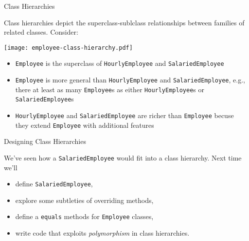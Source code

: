 \documentclass{beamer}
\begin{document}
\begin{frame}[fragile]{Class Hierarchies}

\vspace{-.05in}
Class hierarchies depict the superclass-sublclass relationships between families of related classes.  Consider:
\vspace{-.05in}
\begin{center}
\texttt{[image: employee-class-hierarchy.pdf]}
\end{center}
\vspace{-.2in}
\begin{itemize}
\item {\tt Employee} is the superclass of {\tt HourlyEmployee} and {\tt SalariedEmployee}
\item {\tt Employee} is more general than {\tt HourlyEmployee} and {\tt SalariedEmployee}, e.g., there at least as many {\tt Employee}s as either {\tt HourlyEmployee}s or {\tt SalariedEmployee}s
\item {\tt HourlyEmployee} and {\tt SalariedEmployee} are richer than {\tt Employee} becuse they extend {\tt Employee} with additional features
\end{itemize}


\end{frame}

\begin{frame}[fragile]{Designing Class Hierarchies}


We've seen how a {\tt SalariedEmployee} would fit into a class hierarchy.  Next time we'll
\begin{itemize}
\item define {\tt SalariedEmployee},
\item explore some subtleties of overriding methods,
\item define a {\tt equals} methods for {\tt Employee} classes,
\item write code that exploits {\it polymorphism} in class hierarchies.
\end{itemize}


\end{frame}









\end{document}
